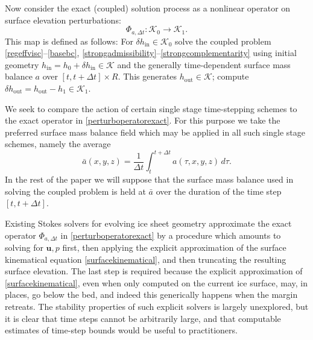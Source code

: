 \documentclass[letterpaper,final,12pt,reqno]{amsart}
\newcommand{\bu}{\mathbf{u}}
\newcommand{\hin}{h_{\text{in}}}
\newcommand{\hout}{h_{\text{out}}}
\newcommand{\dhin}{\delta h_{\text{in}}}
\newcommand{\dhout}{\delta h_{\text{out}}}
\begin{document}
Now consider the exact (coupled) solution process as a nonlinear operator on surface elevation perturbations:
\begin{equation}
\Phi_{a,\Delta t} : \mathcal{K}_0 \to \mathcal{K}_1. \label{perturboperatorexact}
\end{equation}
This map is defined as follows: For $\dhin\in \mathcal{K}_0$ solve the coupled problem \eqref{regeffvisc}--\eqref{basebc}, \eqref{strongadmissibility}--\eqref{strongcomplementarity} using initial geometry $\hin=h_0+\dhin \in \mathcal{K}$ and the generally time-dependent surface mass balance $a$ over $[t,t+\Delta t]\times R$.  This generates $\hout \in \mathcal{K}$; compute $\dhout= \hout - h_1 \in \mathcal{K}_1$.

We seek to compare the action of certain single stage time-stepping schemes to the exact operator in \eqref{perturboperatorexact}.  For this purpose we take the preferred surface mass balance field which may be applied in all such single stage schemes, namely the average
\begin{equation}
\bar a(x,y,z) = \frac{1}{\Delta t} \int_t^{t+\Delta t} a(\tau,x,y,z)\,d\tau.  \label{smbaverage}
\end{equation}
In the rest of the paper we will suppose that the surface mass balance used in solving the coupled problem is held at $\bar a$ over the duration of the time step $[t,t+\Delta t]$.

Existing Stokes solvers for evolving ice sheet geometry \cite{Gudmundsson1999,HelanowAhlkrona2018,Jouvetetal2008,Larouretal2012,
Lengetal2014b,Lengetal2012,LeysingerGudmundsson2004,PralongFunk2004,Seddiketal2012} %
approximate the exact operator $\Phi_{a,\Delta t}$ in \eqref{perturboperatorexact} by a procedure which amounts to solving for $\bu,p$ first, then applying the explicit approximation of the surface kinematical equation \eqref{surfacekinematical}, and then truncating the resulting surface elevation.  The last step is required because the explicit approximation of \eqref{surfacekinematical}, even when only computed on the current ice surface, may, in places, go below the bed, and indeed this generically happens when the margin retreats.  The stability properties of such explicit solvers is largely unexplored, but it is clear that time steps cannot be arbitrarily large, and that computable estimates of time-step bounds would be useful to practitioners.
\end{document}
